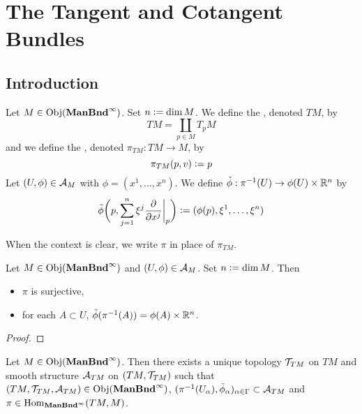 \documentclass{book}
\begin{document}
\newpage
\chapter{The Tangent and Cotangent Bundles}

\section{Introduction}

\begin{defn}
	Let $M \in \operatorname{Obj}(\operatorname*{\text{\textbf{ManBnd}}^{\infty}})$. Set $n \vcentcolon= \dim M$. We define the , denoted $TM$, by  
	$$TM = \coprod_{p \in M} T_p M $$ 
	and we define the , denoted $\pi_{TM}: TM \rightarrow M$, by 
	$$\pi_{TM}(p, v) \vcentcolon= p$$
	Let $(U, \phi) \in \mathcal{A}_M$ with $\phi = (x^1, \ldots, x^n)$. We define $\tilde{\phi}: \pi^{-1}(U) \rightarrow \phi(U) \times \mathbb{R}^n$ by 
	$$\tilde{\phi} \bigg(p, \sum_{j=1}^n \xi^j \frac{\partial}{\partial x^j} \bigg|_p \bigg) \vcentcolon= (\phi(p), \xi^1, \ldots, \xi^n)$$ 
\end{defn}

\begin{note}
	When the context is clear, we write $\pi$ in place of $\pi_{TM}$.
\end{note}

\begin{ex}
	Let $M \in \operatorname{Obj}(\operatorname*{\text{\textbf{ManBnd}}^{\infty}})$ and $(U, \phi) \in \mathcal{A}_M$. Set $n \vcentcolon= \dim M$. Then
	\begin{itemize}
		\item $\pi$ is surjective,
		\item for each $A \subset U$, $\tilde{\phi}(\pi^{-1}(A)) = \phi(A) \times \mathbb{R}^n$.
	\end{itemize}
\end{ex}

\begin{proof}
\end{proof}


\begin{ex}
	Let $M \in \operatorname{Obj}(\operatorname*{\text{\textbf{ManBnd}}^{\infty}})$. Then there exists a unique topology $\mathcal{T}_{TM}$ on $TM$ and smooth structure $\mathcal{A}_{TM}$ on $(TM, \mathcal{T}_{TM})$ such that $(TM, \mathcal{T}_{TM}, \mathcal{A}_{TM}) \in \operatorname{Obj}(\operatorname*{\text{\textbf{ManBnd}}^{\infty}})$,  $(\pi^{-1}(U_{\alpha}), \tilde{\phi}_{\alpha})_{\alpha \in \Gamma} \subset \mathcal{A}_{TM}$ and $\pi \in \operatorname{Hom}_{\operatorname*{\text{\textbf{ManBnd}}^{\infty}}}(TM, M)$. 
\end{ex}
\end{document}
